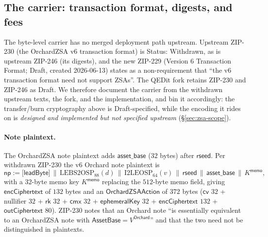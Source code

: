 \documentclass[11pt,a4paper]{article}
\theoremstyle{definition}
\newcommand{\cmx}{\mathsf{cmx}}
\newcommand{\cvsym}{\mathsf{cv}}
\newcommand{\rk}{\mathsf{rk}}
\begin{document}
\subsection{The carrier: transaction format, digests, and fees}
\label{sec:zsa-carrier}

The byte-level carrier has no merged deployment path upstream. Upstream
ZIP-230 (the OrchardZSA v6 transaction format) is Status: Withdrawn, as is
upstream ZIP-246 (its digests), and the new ZIP-229 (Version 6 Transaction
Format; Draft, created 2026-06-13) states as a non-requirement that ``the
v6 transaction format need not support ZSAs''. The QEDit fork retains
ZIP-230 and ZIP-246 as Draft. We therefore document the carrier from the
withdrawn upstream texts, the fork, and the implementation, and bin it
accordingly: the transfer/burn cryptography above is Draft-specified, while
the encoding it rides on is \emph{designed and implemented but not
specified upstream} (\S\ref{sec:zsa-scope}).

\paragraph{Note plaintext.} The OrchardZSA note plaintext adds
$\mathsf{asset\_base}$ ($32$ bytes) after $\mathsf{rseed}$. Per withdrawn
ZIP-230 the v6 Orchard note plaintext is
\[
\mathsf{np} := \bigl[\mathsf{leadByte}\bigr] \,\|\,
\mathrm{LEBS2OSP}_{88}(d) \,\|\, \mathrm{I2LEOSP}_{64}(v) \,\|\,
\mathsf{rseed} \,\|\, \mathsf{asset\_base} \,\|\, K^{\mathsf{memo}},
\]
with a $32$-byte memo key $K^{\mathsf{memo}}$ replacing the $512$-byte memo
field, giving $\mathsf{encCiphertext}$ of $132$ bytes and an
$\mathsf{OrchardZSAAction}$ of $372$ bytes ($\cvsym$ $32$ + nullifier $32$ +
$\rk$ $32$ + $\cmx$ $32$ + $\mathsf{ephemeralKey}$ $32$ +
$\mathsf{encCiphertext}$ $132$ + $\mathsf{outCiphertext}$ $80$). ZIP-230
notes that an Orchard note ``is essentially equivalent to an OrchardZSA
note with $\mathsf{AssetBase} = V^{\mathsf{Orchard}}$'' and that the two
need not be distinguished in plaintexts.
\end{document}
